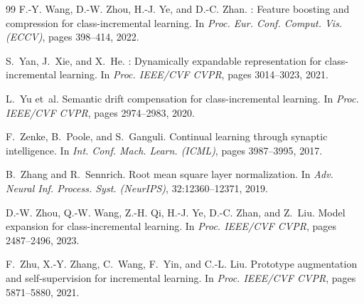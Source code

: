 \documentclass{article}
\begin{document}
\begin{thebibliography}{99}
F.-Y. Wang, D.-W. Zhou, H.-J. Ye, and D.-C. Zhan.
: Feature boosting and compression for class-incremental learning.
\newblock In {\em Proc. Eur. Conf. Comput. Vis. (ECCV)}, pages 398--414, 2022.


S.~Yan, J.~Xie, and X.~He.
: Dynamically expandable representation for class-incremental learning.
\newblock In {\em Proc. IEEE/CVF CVPR}, pages 3014--3023, 2021.

L.~Yu et~al.
\newblock Semantic drift compensation for class-incremental learning.
\newblock In {\em Proc. IEEE/CVF CVPR}, pages 2974--2983, 2020.

F.~Zenke, B.~Poole, and S.~Ganguli.
\newblock Continual learning through synaptic intelligence.
\newblock In {\em Int. Conf. Mach. Learn. (ICML)}, pages 3987--3995, 2017.

B.~Zhang and R.~Sennrich.
\newblock Root mean square layer normalization.
\newblock In {\em Adv. Neural Inf. Process. Syst. (NeurIPS)}, 32:12360--12371, 2019.

D.-W. Zhou, Q.-W. Wang, Z.-H. Qi, H.-J. Ye, D.-C. Zhan, and Z.~Liu.
\newblock Model expansion for class-incremental learning.
\newblock In {\em Proc. IEEE/CVF CVPR}, pages 2487--2496, 2023.

F.~Zhu, X.-Y. Zhang, C.~Wang, F.~Yin, and C.-L. Liu.
\newblock Prototype augmentation and self-supervision for incremental learning.
\newblock In {\em Proc. IEEE/CVF CVPR}, pages 5871--5880, 2021.

\end{thebibliography}
\end{document}
